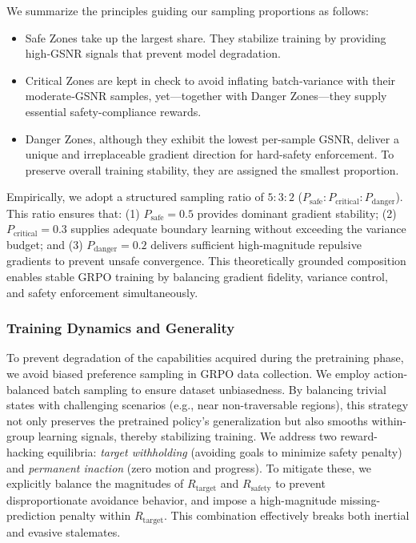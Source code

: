 We summarize the principles guiding our sampling proportions as follows:
\begin{itemize}
    \item Safe Zones take up the largest share. They stabilize training by providing high‐GSNR signals that prevent model degradation.
    \item Critical Zones are kept in check to avoid inflating batch‐variance with their moderate‐GSNR samples, yet—together with Danger Zones—they supply essential safety-compliance rewards.  
    \item Danger Zones, although they exhibit the lowest per-sample GSNR, deliver a unique and irreplaceable gradient direction for hard-safety enforcement. To preserve overall training stability, they are assigned the smallest proportion.
\end{itemize} 
Empirically, we adopt a structured sampling ratio of $5:3:2$ ($P_{\mathrm{safe}} : P_{\mathrm{critical}} : P_{\mathrm{danger}}$). This ratio ensures that: (1) $P_{\mathrm{safe}} = 0.5$ provides dominant gradient stability; (2) $P_{\mathrm{critical}} = 0.3$ supplies adequate boundary learning without exceeding the variance budget; and (3) $P_{\mathrm{danger}} = 0.2$ delivers sufficient high-magnitude repulsive gradients to prevent unsafe convergence. This theoretically grounded composition enables stable GRPO training by balancing gradient fidelity, variance control, and safety enforcement simultaneously.


\subsubsection{Training Dynamics and Generality}
\label{sec:grpo-data}

To prevent degradation of the capabilities acquired during the pretraining phase, we avoid biased preference sampling in GRPO data collection. We employ action-balanced batch sampling to ensure dataset unbiasedness. By balancing trivial states with challenging scenarios (e.g., near non-traversable regions), this strategy not only preserves the pretrained policy's generalization but also smooths within-group learning signals, thereby stabilizing training. We address two reward-hacking equilibria: \textit{target withholding} (avoiding goals to minimize safety penalty) and \textit{permanent inaction} (zero motion and progress). To mitigate these, we explicitly balance the magnitudes of $R_{\mathrm{target}}$ and $R_{\mathrm{safety}}$ to prevent disproportionate avoidance behavior, and impose a high-magnitude missing-prediction penalty within $R_{\mathrm{target}}$. This combination effectively breaks both inertial and evasive stalemates.

